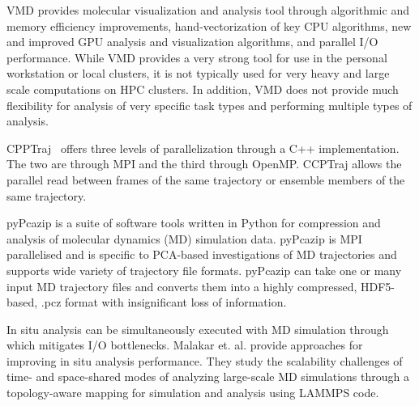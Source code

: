 VMD \cite{VMD2013} provides molecular visualization and analysis tool through algorithmic and memory efficiency improvements, hand-vectorization of key CPU algorithms, new and improved GPU analysis and
visualization algorithms, and parallel I/O performance.
While VMD provides a very strong tool for use in the personal workstation or local clusters, it is not typically used for very heavy and large scale computations on HPC clusters.
In addition, VMD does not provide much flexibility for analysis of very specific task types and performing multiple types of analysis.

CPPTraj~\cite{cpptraj-2013} offers three levels of parallelization through a C++ implementation. The two are through MPI and the third through OpenMP.
CCPTraj allows the parallel read between frames of the same trajectory or ensemble members of the same trajectory. 
 
pyPcazip \cite{pyPcazip} is a suite of software tools written in Python for compression and analysis of molecular dynamics (MD) simulation data. 
pyPcazip is MPI parallelised and is specific to PCA-based investigations of MD trajectories and supports wide variety of trajectory file formats.
pyPcazip can take one or many input MD trajectory files and converts them into a highly compressed, HDF5-based, .pcz format with insignificant loss of information.

In situ analysis can be simultaneously executed with MD simulation through which mitigates I/O bottlenecks.
Malakar et. al. \cite{Malakar-etal} provide approaches for improving in situ analysis performance. 
They study the scalability challenges of time- and space-shared modes of analyzing large-scale MD simulations through a topology-aware mapping for simulation and analysis using LAMMPS code.

